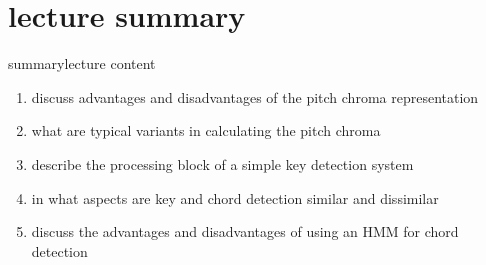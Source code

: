         \section[summary]{lecture summary}
        \begin{frame}{summary}{lecture content}
            \begin{enumerate}
                \item   discuss advantages and disadvantages of the pitch chroma representation
                \smallskip
                \item<2->   what are typical variants in calculating the pitch chroma
                \smallskip
                \item<3->   describe the processing block of a simple key detection system
                \smallskip
                \item<4->   in what aspects are key and chord detection similar and dissimilar
                \smallskip
                \item<5->   discuss the advantages and disadvantages of using an HMM for chord detection
            \end{enumerate}
        \end{frame}


